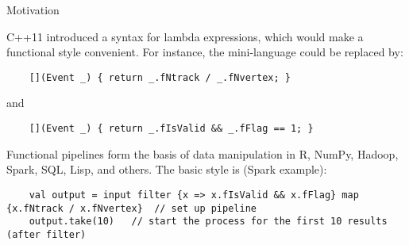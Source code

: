 \documentclass{beamer}
\begin{document}
\begin{frame}[fragile]{Motivation}
\begin{block}{}
C++11 introduced a syntax for lambda expressions, which would make a functional style convenient. For instance, the mini-language could be replaced by:
{\scriptsize \begin{verbatim}
    [](Event _) { return _.fNtrack / _.fNvertex; }
\end{verbatim}}
and
{\scriptsize \begin{verbatim}
    [](Event _) { return _.fIsValid && _.fFlag == 1; }
\end{verbatim}}
\end{block}

\begin{block}{}
Functional pipelines form the basis of data manipulation in R, NumPy, Hadoop, Spark, SQL, Lisp, and others. The basic style is (Spark example):
{\scriptsize \begin{verbatim}
    val output = input filter {x => x.fIsValid && x.fFlag} map {x.fNtrack / x.fNvertex}  // set up pipeline
    output.take(10)   // start the process for the first 10 results (after filter)
\end{verbatim}}


\end{block}




\end{frame}
\end{document}
